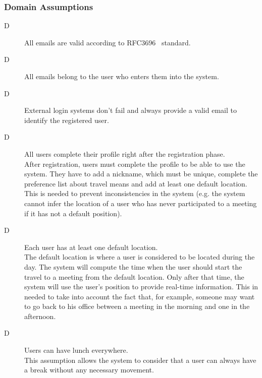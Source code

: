 \subsubsection{Domain Assumptions}

\begin{description}

\item[D\thecountDom] All emails are valid according to RFC3696~\cite{RFC3696} standard.

\item[D\thecountDom] All emails belong to the user who enters them into the system.

\item[D\thecountDom] External login systems don’t fail and always provide a valid email to identify the registered user.

\item[D\thecountDom] All users complete their profile right after the registration phase. \\ [0.1cm]
After registration, users must complete the profile to be able to use the system. They have to add a nickname, which must be unique, complete the preference list about travel means and add at least one default location. This is needed to prevent inconsistencies in the system (e.g. the system cannot infer the location of a user who has never participated to a meeting if it has not a default position).

\item[D\thecountDom] Each user has at least one default location. \\ [0.1cm]
The default location is where a user is considered to be located during the day. The system will compute the time when the user should start the travel to a meeting from the default location. Only after that time, the system will use the user's position to provide real-time information. This in needed to take into account the fact that, for example, someone may want to go back to his office between a meeting in the morning and one in the afternoon.

\item[D\thecountDom] Users can have lunch everywhere. \\ [0.1cm]
This assumption allows the system to consider that a user can always have a break without any necessary movement.


\end{description}
